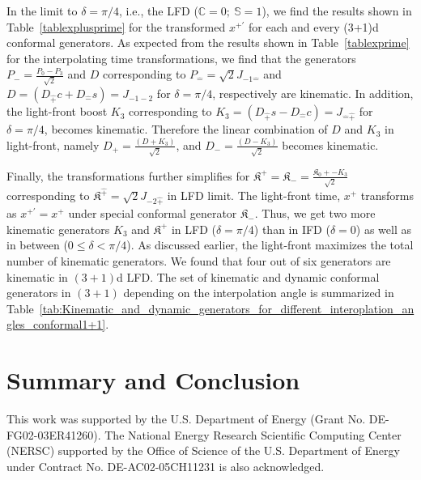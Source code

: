 \documentclass[%
 reprint,
superscriptaddress,
 amsmath,amssymb,
 aps,
]{revtex4-2}
\begin{document}
In the limit to $\delta=\pi/4$, i.e., the LFD ($\mathbb{C}=0;~\mathbb{S}=1$), we find the results shown in Table~\ref{tablexplusprime} for the transformed $x^{+\prime}$ for each and every (3+1)d conformal generators. As expected from the results shown in Table~\ref{tablexprime} for the interpolating time transformations, we find that the generators $P_{-} = \frac{P_{0}-P_{3}}{\sqrt{2}}$ and $D$ corresponding to $P_{\hat -} = \sqrt{2}J_{-1\hat{-}}$ and $D=\left(D_{\hat{+}}c+D_{\hat{-}}s\right)=J_{-1 -2}$ for $\delta =\pi/4$, respectively are kinematic. In addition, the light-front boost $K_3$ corresponding to $K_3=\left(D_{\hat{+}}s-D_{\hat{-}}c\right)=J_{\hat{-}\hat{+}}$ for $\delta =\pi/4$,  becomes kinematic. Therefore the linear combination of $D$ and $K_3$ in light-front, namely  $D_{+}=\frac{(D+K_3)}{\sqrt{2}} $, and $D_{-}=\frac{(D-K_3)}{\sqrt{2}}$ becomes kinematic. 

Finally, the transformations further simplifies for $\mathfrak{K}^{+}=\mathfrak{K}_{-}=\frac{\mathfrak{K}_{0}+\mathfrak-K_3}{\sqrt{2}}$ corresponding to $\mathfrak{K}^{\hat{+}}=\sqrt{2}J_{-2\hat{+}}$ in LFD limit. The light-front time, $x^{+}$ transforms as $ x^{+\prime} =x^{+}$ under special conformal generator $\mathfrak{K}_{-}$. Thus, we get two more kinematic generators $K_3$ and $\mathfrak{K}^{+}$ in LFD ($\delta = \pi/4$) than in IFD ($\delta = 0$) as well as in between ($0 \le \delta <\pi/4$). As discussed earlier, the light-front maximizes the total number of kinematic generators. We found that four out of six generators are kinematic in $(3+1)$d LFD. The set of kinematic and dynamic conformal generators in $(3+1)$ depending on the interpolation angle is summarized in Table~\ref {tab:Kinematic_and_dynamic_generators_for_different_interoplation_angles_conformal1+1}.


\section{Summary and Conclusion}
\label{summary-conclusion}



\acknowledgments
This work was supported by the U.S. Department of Energy (Grant No. DE-FG02-03ER41260).
The National Energy Research Scientific Computing Center (NERSC) supported by the Office of Science of the U.S. Department of Energy under Contract No. DE-AC02-05CH11231 is also acknowledged. 

\appendix



\end{document}
